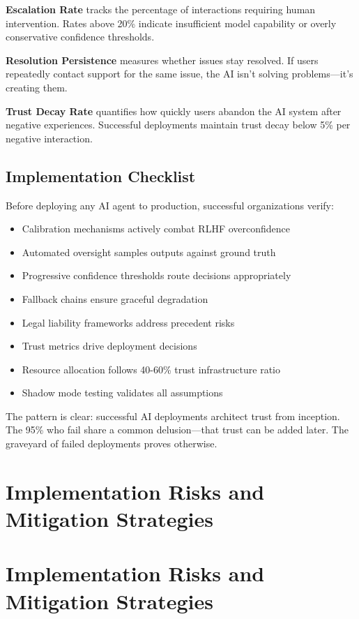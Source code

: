 \documentclass[a4paper,11pt]{article}
\begin{document}
\textbf{Escalation Rate} tracks the percentage of interactions requiring human intervention. Rates above 20\% indicate insufficient model capability or overly conservative confidence thresholds.


\textbf{Resolution Persistence} measures whether issues stay resolved. If users repeatedly contact support for the same issue, the AI isn't solving problems—it's creating them.


\textbf{Trust Decay Rate} quantifies how quickly users abandon the AI system after negative experiences. Successful deployments maintain trust decay below 5\% per negative interaction.


\subsection{Implementation Checklist}

Before deploying any AI agent to production, successful organizations verify:


\begin{itemize}
  \item [ ] Calibration mechanisms actively combat RLHF overconfidence
  \item [ ] Automated oversight samples outputs against ground truth
  \item [ ] Progressive confidence thresholds route decisions appropriately
  \item [ ] Fallback chains ensure graceful degradation
  \item [ ] Legal liability frameworks address precedent risks
  \item [ ] Trust metrics drive deployment decisions
  \item [ ] Resource allocation follows 40-60\% trust infrastructure ratio
  \item [ ] Shadow mode testing validates all assumptions
\end{itemize}

The pattern is clear: successful AI deployments architect trust from inception. The 95\% who fail share a common delusion—that trust can be added later. The graveyard of failed deployments proves otherwise.

\clearpage
\section{Implementation Risks and Mitigation Strategies}

\section{Implementation Risks and Mitigation Strategies}
\end{document}
